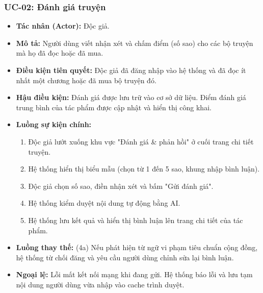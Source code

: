 \subsubsection{UC-02: Đánh giá truyện}
\begin{itemize}
    \item \textbf{Tác nhân (Actor):} Độc giả.
    \item \textbf{Mô tả:} Người dùng viết nhận xét và chấm điểm (số sao) cho các bộ truyện mà họ đã đọc hoặc đã mua.
    \item \textbf{Điều kiện tiên quyết:} Độc giả đã đăng nhập vào hệ thống và đã đọc ít nhất một chương hoặc đã mua bộ truyện đó.
    \item \textbf{Hậu điều kiện:} Đánh giá được lưu trữ vào cơ sở dữ liệu. Điểm đánh giá trung bình của tác phẩm được cập nhật và hiển thị công khai.
    \item \textbf{Luồng sự kiện chính:}
    \begin{enumerate}
        \item Độc giả lướt xuống khu vực "Đánh giá \& phản hồi" ở cuối trang chi tiết truyện.
        \item Hệ thống hiển thị biểu mẫu (chọn từ 1 đến 5 sao, khung nhập bình luận).
        \item Độc giả chọn số sao, điền nhận xét và bấm "Gửi đánh giá".
        \item Hệ thống kiểm duyệt nội dung tự động bằng AI.
        \item Hệ thống lưu kết quả và hiển thị bình luận lên trang chi tiết của tác phẩm.
    \end{enumerate}
    \item \textbf{Luồng thay thế:} (4a) Nếu phát hiện từ ngữ vi phạm tiêu chuẩn cộng đồng, hệ thống từ chối đăng và yêu cầu người dùng chỉnh sửa lại bình luận.
    \item \textbf{Ngoại lệ:} Lỗi mất kết nối mạng khi đang gửi. Hệ thống báo lỗi và lưu tạm nội dung người dùng vừa nhập vào cache trình duyệt.
\end{itemize}

